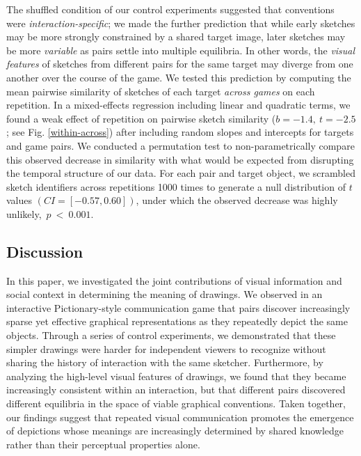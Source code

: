 \documentclass[10pt,letterpaper]{article}
\begin{document}
The shuffled condition of our control experiments suggested that conventions were \emph{interaction-specific}; we made the further prediction that while early sketches may be more strongly constrained by a shared target image, later sketches may be more \emph{variable} as pairs settle into multiple equilibria.
In other words, the \emph{visual features} of sketches from different pairs for the same target may diverge from one another over the course of the game.
We tested this prediction by computing the mean pairwise similarity of sketches of each target \emph{across games} on each repetition.
In a mixed-effects regression including linear and quadratic terms, we found a weak effect of repetition on pairwise sketch similarity ($b = -1.4, ~t = -2.5$; see Fig. \ref{within-across})  after including random slopes and intercepts for targets and game pairs. %
We conducted a permutation test to non-parametrically compare this observed decrease in similarity with what would be expected from disrupting the temporal structure of our data.
For each pair and target object, we scrambled sketch identifiers across repetitions 1000 times to generate a null distribution of $t$ values $(CI = [-0.57, 0.60])$, under which the observed decrease was highly unlikely,~$p~<~0.001$.


\subsection{Discussion}

In this paper, we investigated the joint contributions of visual information and social context in determining the meaning of drawings.
We observed in an interactive Pictionary-style communication game that pairs discover increasingly sparse yet effective graphical representations as they repeatedly depict the same objects.
Through a series of control experiments, we demonstrated that these simpler drawings were harder for independent viewers to recognize without sharing the history of interaction with the same sketcher.
Furthermore, by analyzing the high-level visual features of drawings, we found that they became increasingly consistent within an interaction, but that different pairs discovered different equilibria in the space of viable graphical conventions.
Taken together, our findings suggest that repeated visual communication promotes the emergence of depictions whose meanings are increasingly determined by shared knowledge rather than their perceptual properties alone.
\end{document}
